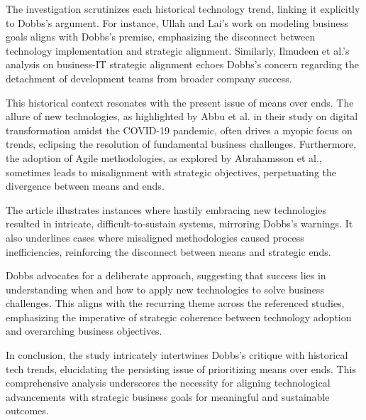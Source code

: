 \documentclass[a4Paper]{article}
\begin{document}
The investigation scrutinizes each historical technology trend, linking it explicitly to Dobbs's argument. For instance, Ullah and Lai's work on modeling business goals aligns with Dobbs's premise, emphasizing the disconnect between technology implementation and strategic alignment. Similarly, Ilmudeen et al.'s analysis on business-IT strategic alignment echoes Dobbs's concern regarding the detachment of development teams from broader company success.

This historical context resonates with the present issue of means over ends. The allure of new technologies, as highlighted by Abbu et al. in their study on digital transformation amidst the COVID-19 pandemic, often drives a myopic focus on trends, eclipsing the resolution of fundamental business challenges. Furthermore, the adoption of Agile methodologies, as explored by Abrahamsson et al., sometimes leads to misalignment with strategic objectives, perpetuating the divergence between means and ends.

The article illustrates instances where hastily embracing new technologies resulted in intricate, difficult-to-sustain systems, mirroring Dobbs's warnings. It also underlines cases where misaligned methodologies caused process inefficiencies, reinforcing the disconnect between means and strategic ends.

Dobbs advocates for a deliberate approach, suggesting that success lies in understanding when and how to apply new technologies to solve business challenges. This aligns with the recurring theme across the referenced studies, emphasizing the imperative of strategic coherence between technology adoption and overarching business objectives.

In conclusion, the study intricately intertwines Dobbs's critique with historical tech trends, elucidating the persisting issue of prioritizing means over ends. This comprehensive analysis underscores the necessity for aligning technological advancements with strategic business goals for meaningful and sustainable outcomes.
\pagebreak
\end{document}
